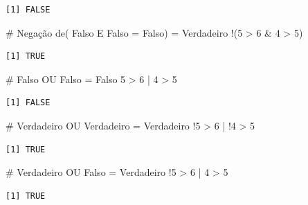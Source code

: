 \documentclass[
  letterpaper,
  DIV=11,
  numbers=noendperiod]{scrreprt}
\newenvironment{Shaded}{\begin{snugshade}}{\end{snugshade}}
\newcommand{\CommentTok}[1]{\textcolor[rgb]{0.37,0.37,0.37}{#1}}
\newcommand{\DecValTok}[1]{\textcolor[rgb]{0.68,0.00,0.00}{#1}}
\newcommand{\NormalTok}[1]{\textcolor[rgb]{0.00,0.23,0.31}{#1}}
\newcommand{\SpecialCharTok}[1]{\textcolor[rgb]{0.37,0.37,0.37}{#1}}
\begin{document}
\begin{verbatim}
[1] FALSE
\end{verbatim}

\begin{Shaded}
\begin{Highlighting}[]
\CommentTok{\# Negação de( Falso E Falso = Falso) = Verdadeiro}
\SpecialCharTok{!}\NormalTok{(}\DecValTok{5} \SpecialCharTok{\textgreater{}} \DecValTok{6} \SpecialCharTok{\&} \DecValTok{4} \SpecialCharTok{\textgreater{}} \DecValTok{5}\NormalTok{)}
\end{Highlighting}
\end{Shaded}

\begin{verbatim}
[1] TRUE
\end{verbatim}

\begin{Shaded}
\begin{Highlighting}[]
\CommentTok{\# Falso OU Falso = Falso}
\DecValTok{5} \SpecialCharTok{\textgreater{}} \DecValTok{6} \SpecialCharTok{|} \DecValTok{4} \SpecialCharTok{\textgreater{}} \DecValTok{5}
\end{Highlighting}
\end{Shaded}

\begin{verbatim}
[1] FALSE
\end{verbatim}

\begin{Shaded}
\begin{Highlighting}[]
\CommentTok{\# Verdadeiro OU Verdadeiro = Verdadeiro}
\SpecialCharTok{!}\DecValTok{5} \SpecialCharTok{\textgreater{}} \DecValTok{6} \SpecialCharTok{|} \SpecialCharTok{!}\DecValTok{4} \SpecialCharTok{\textgreater{}} \DecValTok{5}
\end{Highlighting}
\end{Shaded}

\begin{verbatim}
[1] TRUE
\end{verbatim}

\begin{Shaded}
\begin{Highlighting}[]
\CommentTok{\# Verdadeiro OU Falso = Verdadeiro}
\SpecialCharTok{!}\DecValTok{5} \SpecialCharTok{\textgreater{}} \DecValTok{6} \SpecialCharTok{|} \DecValTok{4} \SpecialCharTok{\textgreater{}} \DecValTok{5}
\end{Highlighting}
\end{Shaded}

\begin{verbatim}
[1] TRUE
\end{verbatim}
\end{document}
